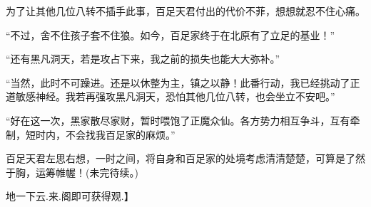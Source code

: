 \begin{this_body}
为了让其他几位八转不插手此事，百足天君付出的代价不菲，想想就忍不住心痛。

“不过，舍不住孩子套不住狼。如今，百足家终于在北原有了立足的基业！”

“还有黑凡洞天，若是攻占下来，我之前的损失也能大大弥补。”

“当然，此时不可躁进。还是以休整为主，镇之以静！此番行动，我已经挑动了正道敏感神经。我若再强攻黑凡洞天，恐怕其他几位八转，也会坐立不安吧。”

“好在这一次，黑家散尽家财，暂时喂饱了正魔众仙。各方势力相互争斗，互有牵制，短时内，不会找我百足家的麻烦。”

百足天君左思右想，一时之间，将自身和百足家的处境考虑清清楚楚，可算是了然于胸，运筹帷幄！(未完待续。)

地一下云.来.阁即可获得观.】

\end{this_body}

